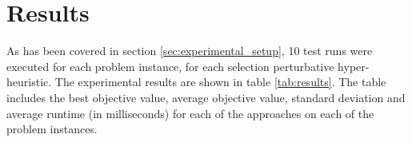 \section{Results}\label{sec:results}
As has been covered in section \ref{sec:experimental_setup}, 10 test runs were executed for each problem instance, for each selection perturbative hyper-heuristic. The experimental results are shown in table \ref{tab:results}. The table includes the best objective value, average objective value, standard deviation and average runtime (in milliseconds) for each of the approaches on each of the problem instances.

\begin{table}[H]
\end{table}
